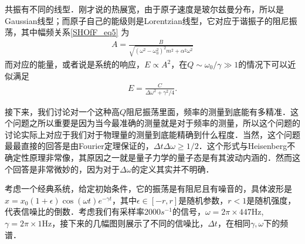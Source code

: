 共振有不同的线型．刚才说的热展宽，由于原子速度是玻尔兹曼分布，所以是Gaussian线型；而原子自己的能级则是Lorentzian线型，它对应于谐振子的阻尼振荡，其中幅频关系\autoref{SHOfF_eq5} 为
\begin{align}
A = \frac{B}{\sqrt{(\omega^2 - \omega_0^2)^2 m^2 + \alpha^2\omega^2}}
\end{align}
而对应的能量，或者说是系统的响应，$E\propto A^2$，在$Q\sim\omega_0/\gamma\gg1$的情况下可以近似满足
\begin{align}
E = \frac{C}{\Delta\omega^2 + \gamma^2/4}. 
\end{align}

接下来，我们讨论对一个这种高$Q$阻尼振荡里面，频率的测量到底能有多精准．这个问题之所以重要是因为当今最准确的测量就是对于频率的测量，所以这个问题的讨论实际上对应于我们对于物理量的测量到底能精确到什么程度．当然，这个问题最最直接的回答是由Fourier定理保证的，$\Delta t\Delta \omega\ge1/2$．这个形式与Heisenberg不确定性原理非常像，其原因之一就是量子力学的量子态是有其波动内涵的．然而这个回答是非常微妙的，因为对于$\Delta\omega$的定义其实并不明确．

考虑一个经典系统，给定初始条件，它的振荡是有阻尼且有噪音的，具体波形是$x=x_0(1+\epsilon)\cos(\omega t)e^{-\gamma t}$，其中$\epsilon\in[-r,r]$是随机参数，$r<1$是随机强度，代表信噪比的倒数．考虑我们有采样率2000$s^{-1}$的信号，$\omega=2\pi\times447$Hz, $\gamma=2\pi\times1$Hz，接下来的几幅图则展示了不同的信噪比，$\Delta t$，在相同$\gamma, \omega$下的频谱．

















